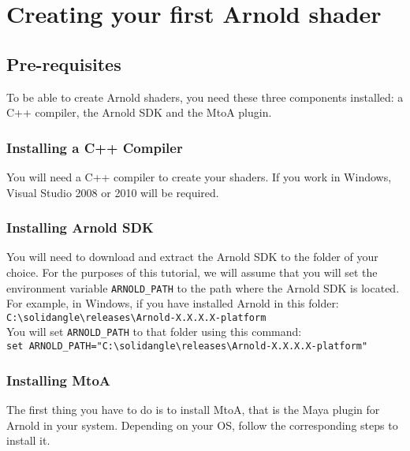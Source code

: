 \section{Creating your first Arnold shader}

\subsection{Pre-requisites}

To be able to create Arnold shaders, you need these three components installed: a C++ compiler,
the Arnold SDK and the MtoA plugin.

\subsubsection{Installing a C++ Compiler}
You will need a C++ compiler to create your shaders. If you work in Windows, Visual Studio 2008
or 2010 will be required.

\subsubsection{Installing Arnold SDK}
You will need to download and extract the Arnold SDK to the folder of your choice.
For the purposes of this tutorial,
we will assume that you will set the environment variable \texttt{ARNOLD\_PATH} to the path where
the Arnold SDK is located. For example, in Windows, if you have installed Arnold in this folder:\\
\verb|C:\solidangle\releases\Arnold-X.X.X.X-platform|\\
You will set \texttt{ARNOLD\_PATH} to that folder using this command:\\
{\footnotesize \verb|set ARNOLD_PATH="C:\solidangle\releases\Arnold-X.X.X.X-platform"| }


\subsubsection{Installing MtoA}
The first thing you have to do is to install MtoA, that is the Maya plugin for Arnold in your system. Depending on your OS, follow the corresponding steps to install it.


